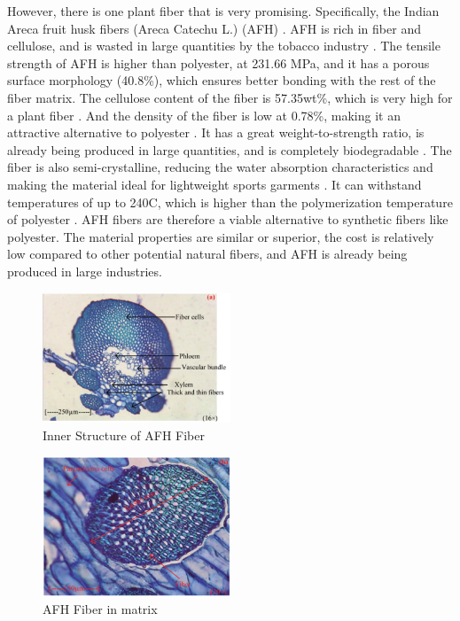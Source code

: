 \documentclass{article}
\begin{document}
However, there is one plant fiber that is very promising. Specifically, the Indian Areca fruit husk fibers (Areca Catechu L.) (AFH) \autocite{afhfiber}. AFH is rich in fiber and cellulose, and is wasted in large quantities by the tobacco industry \autocite{afhfiber}. The tensile strength of AFH is higher than polyester, at 231.66 MPa, and it has a porous surface morphology (40.8\%), which ensures better bonding with the rest of the fiber matrix. The cellulose content of the fiber is 57.35wt\%, which is very high for a plant fiber \autocite{afhfiber}. And the density of the fiber is low at 0.78\%, making it an attractive alternative to polyester \autocite{afhfiber}. It has a great weight-to-strength ratio, is already being produced in large quantities, and is completely biodegradable \autocite{afhfiber}. The fiber is also semi-crystalline, reducing the water absorption characteristics and making the material ideal for lightweight sports garments \autocite{afhfiber}. It can withstand temperatures of up to 240C, which is higher than the polymerization temperature of polyester \autocite{afhfiber}. AFH fibers are therefore a viable alternative to synthetic fibers like polyester. The material properties are similar or superior, the cost is relatively low compared to other potential natural fibers, and AFH is already being produced in large industries.

\begin{figure}
  \centering
  \includegraphics[width=0.5\textwidth]{assets/afh_fiber_structure.png}
  \caption{Inner Structure of AFH Fiber \protect\autocite{afhfiber}}
  \label{fig:afhstructure}
\end{figure}

\begin{figure}
  \centering
  \includegraphics[width=0.5\textwidth]{assets/afh_fiber_top.png}
  \caption{AFH Fiber in matrix \protect\autocite{afhfiber}}
  \label{fig:afhinmatrix}
\end{figure}
\end{document}
